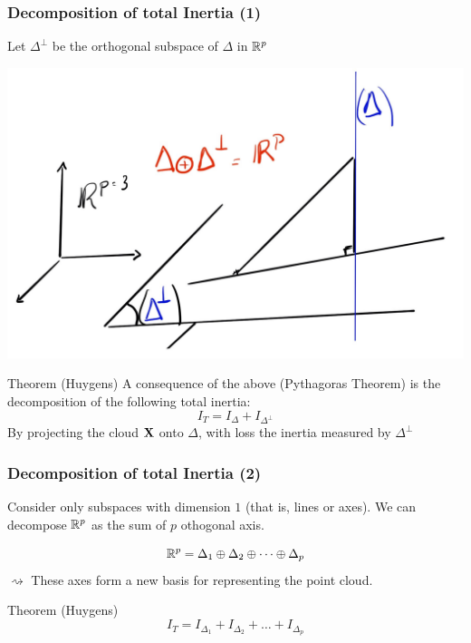 \documentclass{beamer}\usepackage[]{graphicx}\usepackage[]{color}
\begin{document}
\begin{frame}
  \frametitle{Decomposition of total Inertia (1)}
  
  Let $\Delta^\bot$ be the orthogonal subspace of $\Delta$ in $\mathbb{R}^p$

  \includegraphics[width=.5\textwidth]{supp_spaces}

  \begin{block}{Theorem (Huygens)}
    A consequence of the above (Pythagoras Theorem) is the decomposition of the following total inertia:
      \begin{equation*}
        I_T = I_{\Delta} + I_{\Delta^\bot}
      \end{equation*}
    \alert{By projecting the cloud $\mathbf{X}$ onto $\Delta$, with loss the inertia measured by $\Delta^\bot$}
    \end{block}
        
\end{frame}

\begin{frame}
  \frametitle{Decomposition of total Inertia (2)}
  
  Consider only subspaces with dimension $1$ (that is, lines or axes). We can decompose $\mathbb{R}^p$ as the sum of $p$ othogonal axis. 
  
  \begin{equation*}
    \mathbb{R}^p = \Delta_1 \oplus \Delta_2 \oplus \dots \oplus \Delta_p
  \end{equation*}
  \alert{$\rightsquigarrow$ These axes form a new basis for representing the point cloud.}

  \begin{block}{Theorem (Huygens)}
    \begin{equation*}
      I_{T} = I_{\Delta_1} + I_{\Delta_2} + \dots + I_{\Delta_p}
    \end{equation*}
  \end{block}
  
\end{frame}

\end{document}
